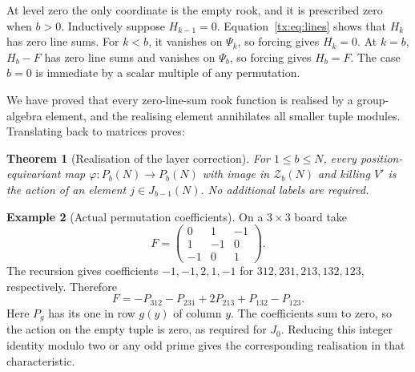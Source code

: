 \documentclass[11pt,a4paper,oneside,openany]{book}
\newtheorem{theorem}{Theorem}[chapter]
\theoremstyle{definition}\newtheorem{definition}[theorem]{Definition}
\newtheorem{example}[theorem]{Example}
\theoremstyle{remark}\newtheorem{remark}[theorem]{Remark}
\numberwithin{equation}{chapter}
\begin{document}
At level zero the only coordinate is the empty rook, and it is prescribed zero when $b>0$. Inductively suppose $H_{k-1}=0$. Equation~\eqref{tx:eq:lines} shows that $H_k$ has zero line sums. For $k<b$, it vanishes on $\Psi_k$, so forcing gives $H_k=0$. At $k=b$, $H_b-F$ has zero line sums and vanishes on $\Psi_b$, so forcing gives $H_b=F$. The case $b=0$ is immediate by a scalar multiple of any permutation.

We have proved that every zero-line-sum rook function is realised by a group-algebra element, and the realising element annihilates all smaller tuple modules. Translating back to matrices proves:
\begin{theorem}[Realisation of the layer correction]\label{tx:thm:realization}
For $1\le b\le N$, every position-equivariant map $\varphi:P_b(N)\to P_b(N)$ with image in $\mathcal Z_b(N)$ and killing $V'$ is the action of an element $j\in J_{b-1}(N)$. No additional labels are required.
\end{theorem}

\begin{example}[Actual permutation coefficients]
On a $3\times3$ board take
\[F=\begin{pmatrix}0&1&-1\\1&-1&0\\-1&0&1\end{pmatrix}.
\]
The recursion gives coefficients $-1,-1,2,1,-1$ for $312,231,213,132,123$, respectively. Therefore
\[F=-P_{312}-P_{231}+2P_{213}+P_{132}-P_{123}.
\]
Here $P_g$ has its one in row $g(y)$ of column $y$. The coefficients sum to zero, so the action on the empty tuple is zero, as required for $J_0$. Reducing this integer identity modulo two or any odd prime gives the corresponding realisation in that characteristic.
\end{example}
\end{document}
